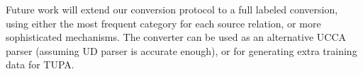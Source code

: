 \documentclass[11pt,a4paper]{article}
\begin{document}
Future work will extend our conversion protocol to a full labeled conversion,
using either the most frequent category for each source relation,
or more sophisticated mechanisms.
The converter can be used as an alternative UCCA parser (assuming UD parser
is accurate enough), or for generating extra training data for TUPA.






\end{document}
